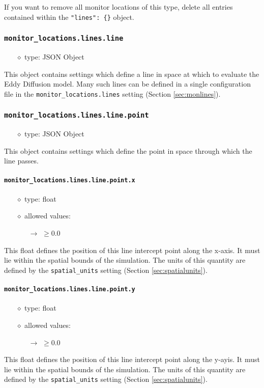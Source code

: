 \documentclass[]{article}
\def\code#1{\texttt{#1}}
\begin{document}
\noindent If you want to remove all monitor locations of this type, delete all
entries contained within the \code{"lines": \{\}} object.

\subsubsection{\code{monitor\_locations.lines.line}}
\begin{itemize}
    \item[$\diamond$] type: JSON Object 
\end{itemize}
This object contains settings which define a line in space at which to evaluate
the Eddy Diffusion model. Many such lines can be defined in a single
configuration file in the \code{monitor\_locations.lines} setting (Section
\ref{sec:monlines}).

\subsubsection{\code{monitor\_locations.lines.line.point}}
\begin{itemize}
    \item[$\diamond$] type: JSON Object 
\end{itemize}
This object contains settings which define the point in space through which the
line passes.

\paragraph{\code{monitor\_locations.lines.line.point.x}}
\begin{itemize}
    \item[$\diamond$] type: float 
    \item[$\diamond$] allowed values:
    \begin{itemize}
        \item[$\rightarrow$] $\geq0.0$
    \end{itemize}
\end{itemize}
This float defines the position of this line intercept point along the x-axis. It
must lie within the spatial bounds of the simulation. The units of this quantity
are defined by the \code{spatial\_units} setting (Section
\ref{sec:spatialunits}).

\paragraph{\code{monitor\_locations.lines.line.point.y}}
\begin{itemize}
    \item[$\diamond$] type: float 
    \item[$\diamond$] allowed values:
    \begin{itemize}
        \item[$\rightarrow$] $\geq0.0$
    \end{itemize}
\end{itemize}
This float defines the position of this line intercept point along the y-ayis. It
must lie within the spatial bounds of the simulation. The units of this quantity
are defined by the \code{spatial\_units} setting (Section
\ref{sec:spatialunits}).
\end{document}
